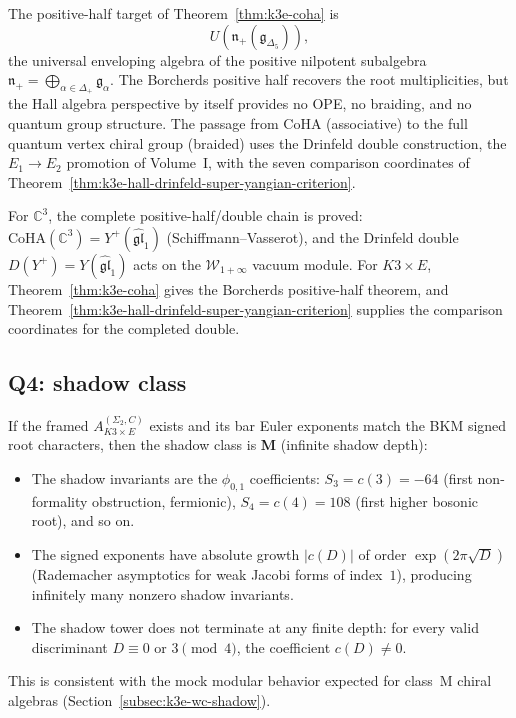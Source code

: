The positive-half target of Theorem~\ref{thm:k3e-coha} is
\[
 U(\mathfrak{n}_+(\mathfrak{g}_{\Delta_5})),
\]
the universal enveloping algebra of the positive
nilpotent subalgebra $\mathfrak{n}_+ = \bigoplus_{\alpha \in \Delta_+}
\mathfrak{g}_\alpha$. The Borcherds positive half recovers the root
multiplicities, but the Hall algebra perspective by itself provides no
OPE, no braiding, and no quantum group structure. The passage from CoHA
(associative) to the full quantum vertex chiral group (braided) uses the
Drinfeld double construction, the $E_1 \to E_2$ promotion of Volume~I,
with the seven comparison coordinates of
Theorem~\ref{thm:k3e-hall-drinfeld-super-yangian-criterion}.

\begin{remark}
\label{rem:bkm-c3-comparison}
For $\mathbb{C}^3$, the complete positive-half/double chain is proved: $\mathrm{CoHA}(\mathbb{C}^3) = Y^+(\widehat{\mathfrak{gl}}_1)$ (Schiffmann--Vasserot), and the Drinfeld double $D(Y^+)=Y(\widehat{\mathfrak{gl}}_1)$ acts on the $\mathcal{W}_{1+\infty}$ vacuum module. For $K3 \times E$, Theorem~\ref{thm:k3e-coha} gives the Borcherds positive-half theorem, and Theorem~\ref{thm:k3e-hall-drinfeld-super-yangian-criterion} supplies the comparison coordinates for the completed double.
\end{remark}

\subsection{Q4: shadow class}
\label{subsec:k3e-bkm-q4}

If the framed $A_{K3 \times E}^{(\Sigma_2,C)}$ exists and its bar Euler exponents match the BKM signed root characters, then the shadow class is \textbf{M} (infinite shadow depth):
\begin{itemize}
 \item The shadow invariants are the $\phi_{0,1}$ coefficients: $S_3 = c(3) = -64$ (first non-formality obstruction, fermionic), $S_4 = c(4) = 108$ (first higher bosonic root), and so on.
 \item The signed exponents have absolute growth $|c(D)|$ of order $\exp(2\pi\sqrt{D})$ (Rademacher asymptotics for weak Jacobi forms of index~$1$), producing infinitely many nonzero shadow invariants.
 \item The shadow tower does not terminate at any finite depth: for every valid discriminant $D \equiv 0$ or $3 \pmod{4}$, the coefficient $c(D) \neq 0$.
\end{itemize}
This is consistent with the mock modular behavior expected for class~M chiral algebras (Section~\ref{subsec:k3e-wc-shadow}).

